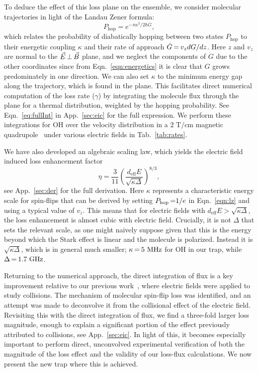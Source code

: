 \documentclass[%
 reprint,
 amsmath,amssymb,
 aps,
pra,
]{revtex4-1}
\newcommand{\epb}{{$\vec{E}\s {\perp}\s\vec{B}$}}
\newcommand{\s}{{\nobreak\hspace{.2em}}}
\begin{document}
To deduce the effect of this loss plane on the ensemble, we consider molecular trajectories in light of the Landau Zener formula:
\begin{equation}
\label{eqn:lz}
P_\text{hop}=e^{-\pi\kappa^2/2\hbar\dot{G}},
\end{equation}
which relates the probability of diabatically hopping between two states $P_\text{hop}$ to their energetic coupling $\kappa$ and their rate of approach $\dot{G}\s {=}\s v_zdG/dz$.
Here $z$ and $v_z$ are normal to the \epb{} plane, and we neglect the components of $\dot{G}$ due to the other coordinates since from Eqn.~\ref{eqn:energetics} it is clear that $G$ grows predominately in one direction.
We can also set $\kappa$ to the minimum energy gap along the trajectory, which is found in the plane.
This facilitates direct numerical computation of the loss rate ($\gamma$) by integrating the molecule flux through the plane for a thermal distribution, weighted by the hopping probability. See Eqn.~\ref{eq:fullInt} in App.~\ref{sec:eic} for the full expression.
We perform these integrations for OH over the velocity distribution in a $2\text{ T/cm}$ magnetic quadrupole~\cite{Sawyer2008} under various electric fields in Tab.~\ref{tab:rates}.

We have also developed an algebraic scaling law, which yields the electric field induced loss enhancement factor
\begin{equation}
\label{eq:etaMT}
\eta=\frac{3}{11} \left(\frac{d_\text{eff}E}{\sqrt{\kappa\Delta}}\right)^{8/3},
\end{equation}
see App.~\ref{sec:der} for the full derivation.
Here $\kappa$ represents a characteristic energy scale for spin-flips that can be derived by setting $P_\text{hop}\s {=}1/e$ in Eqn.~\ref{eqn:lz} and using a typical value of $v_z$.
This means that for electric fields with $d_\text{eff}E>\sqrt{\kappa\Delta}$, the loss enhancement is almost cubic with electric field.
Crucially, it is not $\Delta$ that sets the relevant scale, as one might naively suppose given that this is the energy beyond which the Stark effect is linear and the molecule is polarized.
Instead it is $\sqrt{\kappa\Delta}$, which is in general much smaller; $\kappa\s {=}\s 5\text{ MHz}$ for OH in our trap, while $\Delta\s {=}\s1.7\text{ GHz}$.

Returning to the numerical approach, the direct integration of flux is a key improvement relative to our previous work~\cite{Stuhl2013}, where electric fields were applied to study collisions.
The mechanism of molecular spin-flip loss was identified, and an attempt was made to deconvolve it from the collisional effect of the electric field.
Revisiting this with the direct integration of flux, we find a three-fold larger loss magnitude, enough to explain a significant portion of the effect previously attributed to collisions, see App.~\ref{sec:eic}.
In light of this, it becomes especially important to perform direct, unconvolved experimental verification of both the magnitude of the loss effect and the validity of our loss-flux calculations.
We now present the new trap where this is achieved.
\end{document}
